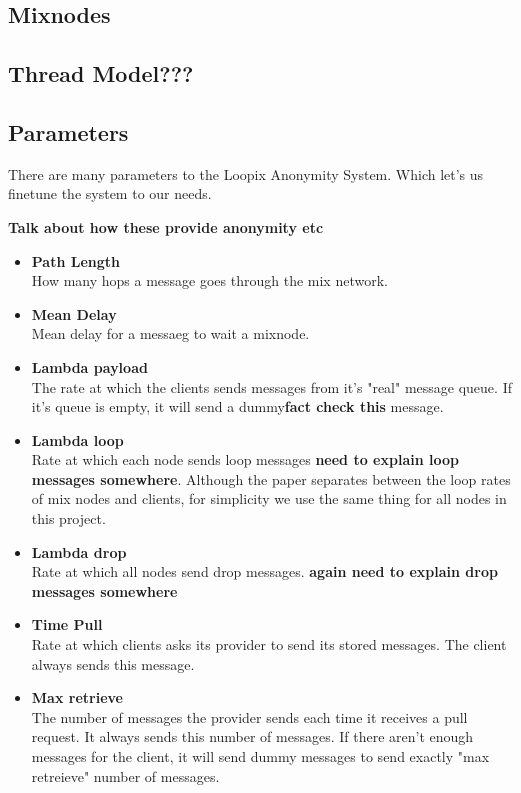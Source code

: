 \documentclass[a4paper,11pt,oneside]{report}
\begin{document}
\subsection{Mixnodes}

\subsection{Thread Model???}

\subsection{Parameters}
There are many parameters to the Loopix Anonymity System. Which let's us finetune the system to our needs.

\textbf{Talk about how these provide anonymity etc}
\begin{itemize}
\item \textbf{Path Length} \\
How many hops a message goes through the mix network.
\item \textbf{Mean Delay} \\
Mean delay for a messaeg to wait a mixnode.
\item \textbf{Lambda payload} \\
The rate at which the clients sends messages from it's "real" message queue. If it's queue is empty, it will send a dummy\textbf{fact check this} message.
\item \textbf{Lambda loop} \\ 
Rate at which each node sends loop messages \textbf{need to explain loop messages somewhere}. Although the paper separates between the loop rates of mix nodes and clients, for simplicity we use the same thing for all nodes in this project.
\item \textbf{Lambda drop} \\
Rate at which all nodes send drop messages. \textbf{again need to explain drop messages somewhere}
\item \textbf{Time Pull} \\
Rate at which clients asks its provider to send its stored messages. The client always sends this message.
\item \textbf{Max retrieve} \\
The number of messages the provider sends each time it receives a pull request. It always sends this number of messages. If there aren't enough messages for the client, it will send dummy messages to send exactly "max retreieve" number of messages.
\end{itemize}
\end{document}

